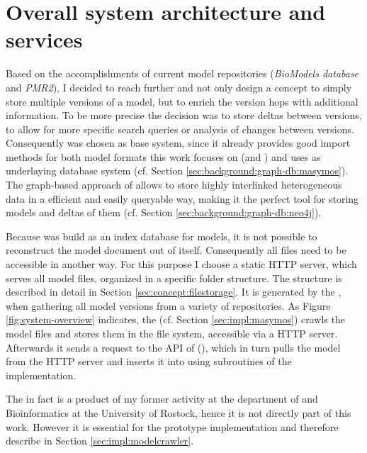 \label{sec:concept}

\section{Overall system architecture and services}
\label{sec:concept:sysarchitecture}

Based on the accomplishments of current model repositories (\emph{BioModels database} and \emph{PMR2}), I decided to reach further and not only design a concept to simply store multiple versions of a model, but to enrich the version hops with additional information. To be more precise the decision was to store deltas between versions, to allow for more specific search queries or analysis of changes between versions.
Consequently \masymos was chosen as base system, since it already provides good import methods for both model formats this work focuses on (\sbml and \cellml) and uses \neoj as underlaying database system (cf. Section \ref{sec:background:graph-db:masymos}). The graph-based approach of \neoj allows to store highly interlinked heterogeneous data in a efficient and easily queryable way, making it the perfect tool for storing \sysbio models and deltas of them (cf. Section \ref{sec:background:graph-db:neo4j}).  

Because \masymos was build as an index database for models, it is not possible to reconstruct the \xml model document out of \masymos itself. Consequently all files need to be accessible in another way. For this purpose I choose a static HTTP server, which serves all model files, organized in a specific folder structure. The structure is described in detail in Section \ref{sec:concept:filestorage}.
It is generated by the \modelcrawler, when gathering all model versions from a variety of repositories. As Figure \ref{fig:system-overview} indicates, the \modelcrawler (cf. Section \ref{sec:impl:masymos}) crawls the model files and stores them in the file system, accessible via a HTTP server. Afterwards it sends a request to the \rest API of \masymos (\morre), which in turn pulls the model from the HTTP server and inserts it into \neoj using subroutines of the \masymos implementation.

The \modelcrawler in fact is a product of my former activity at the department of \sysbio and Bioinformatics at the University of Rostock, hence it is not directly part of this work. However it is essential for the prototype implementation and therefore describe in Section \ref{sec:impl:modelcrawler}.

